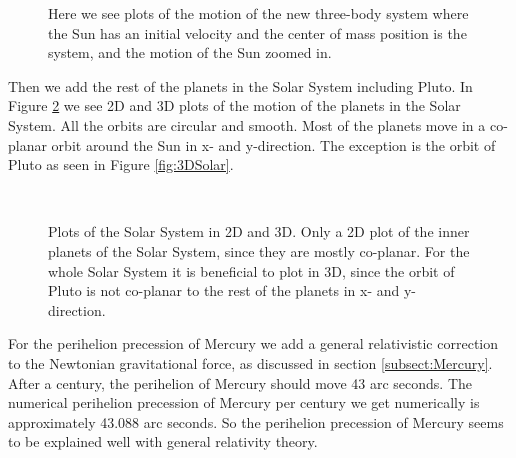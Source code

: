 \documentclass[12pt,a4paper,english]{article}
\begin{document}
\begin{figure}[htbp]
	\hspace{0.5em}
	\caption{Here we see plots of the motion of the new three-body system where the Sun has an initial velocity and the center of mass position is the system, and the motion of the Sun zoomed in. \label{fig:SunEarthJupiter}}
\end{figure}

Then we add the rest of the planets in the Solar System including Pluto. In Figure \ref{fig:SolarSystem} we see 2D and 3D plots of the motion of the planets in the Solar System. All the orbits are circular and smooth. Most of the planets move in a co-planar orbit around the Sun in x- and y-direction. The exception is the orbit of Pluto as seen in Figure \ref{fig:3DSolar}.

\begin{figure}[htbp]
	\hspace{0.5em}
	\\
	\caption{Plots of the Solar System in 2D and 3D. Only a 2D plot of the inner planets of the Solar System, since they are mostly co-planar. For the whole Solar System it is beneficial to plot in 3D, since the orbit of Pluto is not co-planar to the rest of the planets in x- and y-direction. \label{fig:SolarSystem}}
\end{figure}

For the perihelion precession of Mercury we add a general relativistic correction to the Newtonian gravitational force, as discussed in section \ref{subsect:Mercury}. After a century, the perihelion of Mercury should move 43 arc seconds. The numerical perihelion precession of Mercury per century we get numerically is approximately 43.088 arc seconds. So the perihelion precession of Mercury seems to be explained well with general relativity theory.
\end{document}
